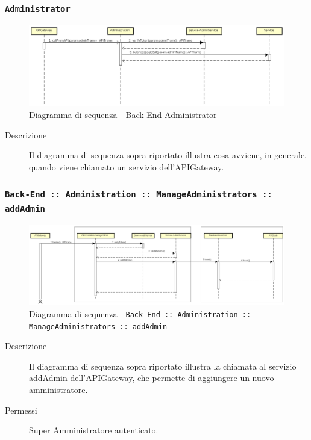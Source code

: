 \documentclass[../DefinizioneDiProdotto_v2.0.0.tex]{subfiles}
\begin{document}
\subsubsection{\texttt{Administrator}}
\begin{figure}[!h]
	\centering
	\includegraphics[scale=0.3]{DiagrammiSequenza/Back-End/DiagrammaSequenzaBackendAdmin.png}
	\caption{Diagramma di sequenza - Back-End Administrator }
\end{figure}
\begin{description}
	\item [Descrizione] Il diagramma di sequenza sopra riportato illustra cosa avviene, in generale, quando viene chiamato un servizio dell'APIGateway.
\end{description}

\subsubsection{\texttt{Back-End :: Administration :: ManageAdministrators :: addAdmin}}
\begin{figure}[!h]
	\centering
	\includegraphics[scale=0.3]{DiagrammiSequenza/Back-End/manageAdministrators/addAdmin.png}
	\caption{Diagramma di sequenza - \texttt{Back-End :: Administration :: ManageAdministrators :: addAdmin} }
\end{figure}
\begin{description}
	\item [Descrizione] Il diagramma di sequenza sopra riportato  illustra la chiamata al servizio addAdmin dell'APIGateway, che permette di aggiungere un nuovo amministratore.
	\item [Permessi] Super Amministratore autenticato.
\end{description}
\end{document}
